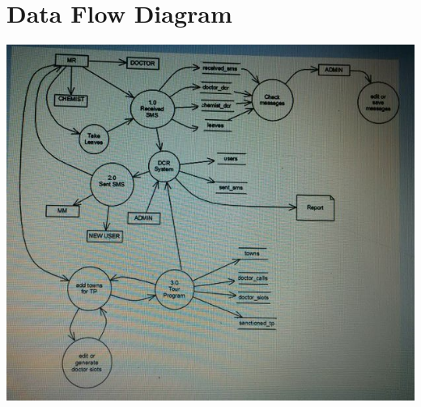 \section{Data Flow Diagram}

\includegraphics[scale=.9]{Diag/d1.png}
\label{fig:Contex Level}





\